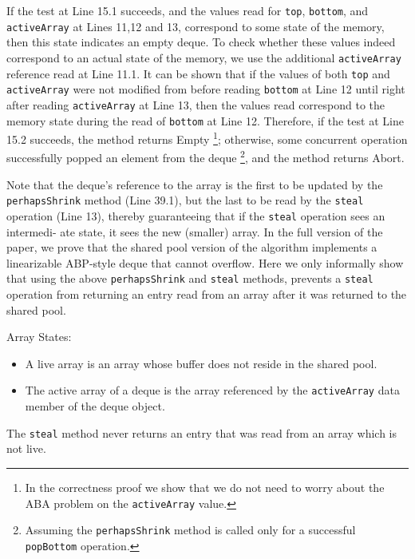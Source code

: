 If the test at Line 15.1 succeeds, and the values read for
\lstinline!top!, \lstinline!bottom!, and \lstinline!activeArray! at
Lines 11,12 and 13, correspond to some state of the memory, then this
state indicates an empty deque. To check whether these values indeed
correspond to an actual state of the memory, we use the additional
\lstinline!activeArray! reference read at Line 11.1. It can be shown
that if the values of both \lstinline!top! and \lstinline!activeArray!
were not modified from before reading \lstinline!bottom! at Line 12
until right after reading \lstinline!activeArray! at Line 13, then the
values read correspond to the memory state during the read of
\lstinline!bottom! at Line 12. Therefore, if the test at Line 15.2
succeeds, the method returns Empty \footnote{In the correctness proof
  we show that we do not need to worry about the ABA problem on the
  \lstinline!activeArray! value.}; otherwise, some concurrent
operation successfully popped an element from the deque
\footnote{Assuming the \lstinline!perhapsShrink! method is called only
  for a successful \lstinline!popBottom! operation.}, and the method
returns Abort.

Note that the deque's reference to the array is the first to be
updated by the \lstinline!perhapsShrink! method (Line 39.1), but the
last to be read by the \lstinline!steal! operation (Line 13), thereby
guaranteeing that if the \lstinline!steal! operation sees an
intermedi- ate state, it sees the new (smaller) array. In the full
version of the paper, we prove that the shared pool version of the
algorithm implements a linearizable ABP-style deque that cannot
overflow. Here we only informally show that using the above
\lstinline!perhapsShrink! and \lstinline!steal! methods, prevents a
\lstinline!steal! operation from returning an entry read from an array
after it was returned to the shared pool.

\begin{definition}
  Array States:
  \begin{itemize}
  \item A live array is an array whose buffer does not reside in the
    shared pool.
  \item The active array of a deque is the array referenced by the
    \lstinline!activeArray! data member of the deque object.
  \end{itemize}
\end{definition}

\begin{lemma}
  The \lstinline!steal! method never returns an entry that was read
  from an array which is not live.
\end{lemma}

